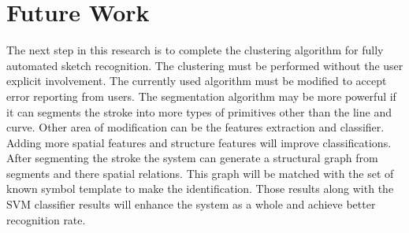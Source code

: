 \newpage

\section{Future Work}
\label{sec:FutureWork}


The next step in this research is to complete the clustering algorithm for fully automated sketch recognition. The clustering must be performed without the user explicit involvement.  The currently used algorithm must be modified to accept error reporting from users. The segmentation algorithm may be more powerful if it can segments the stroke into more types of primitives other than the line and curve. Other area of modification can be the features extraction and classifier. Adding more spatial features and structure features will improve classifications. After segmenting the stroke the system can generate a structural graph from segments and there spatial relations. This graph will be matched with the set of known symbol template to make the identification. Those results along with the SVM classifier results will enhance the system as a whole and achieve better recognition rate.  %
